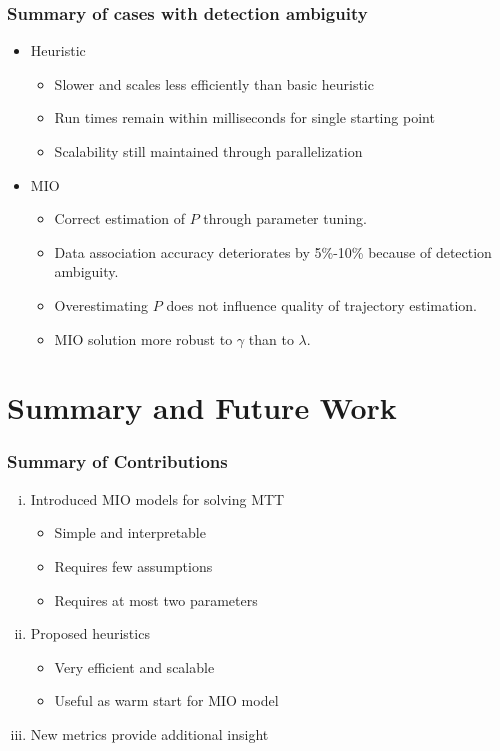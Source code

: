 \documentclass{beamer}
\begin{document}
\begin{frame}
\frametitle{Summary of cases with detection ambiguity} 

\begin{itemize}
\item Heuristic
\begin{itemize}
\item Slower and scales less efficiently than basic heuristic
\item Run times remain within milliseconds for single starting point
\item Scalability still maintained through parallelization
\end{itemize}
\item MIO
\begin{itemize}
\item Correct estimation of $P$ through parameter tuning.
\item Data association accuracy deteriorates by 5\%-10\% because of detection ambiguity.
\item Overestimating $P$ does not influence quality of trajectory estimation.
\item MIO solution more robust to $\gamma$ than to  $\lambda$.
\end{itemize}
\end{itemize}
\end{frame}

\section{Summary and Future Work}
\begin{frame}
\frametitle{Summary of Contributions}
\begin{enumerate}[(i)]
\item Introduced MIO models for solving MTT 
\begin{itemize}
\item Simple and interpretable
\item Requires few assumptions
\item Requires at most two parameters
\end{itemize}
\item Proposed heuristics
\begin{itemize}
\item Very efficient and scalable
\item Useful as warm start for MIO model
\end{itemize}
\item New metrics provide additional insight
\end{enumerate}
\end{frame}
\end{document}
